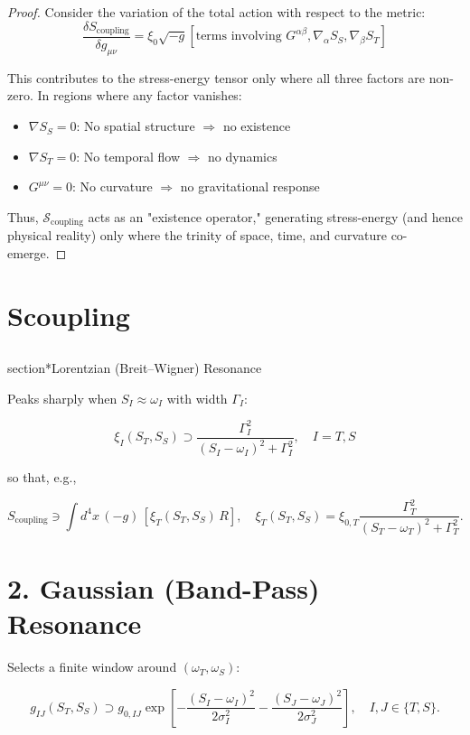 \documentclass[12pt, a4paper]{article}
\begin{document}
\begin{proof}
Consider the variation of the total action with respect to the metric:
\[
\frac{\delta S_{\text{coupling}}}{\delta g_{\mu\nu}} = 
\xi_0 \sqrt{-g} \left[ \text{terms involving } G^{\alpha\beta}, 
\nabla_\alpha S_S, \nabla_\beta S_T \right]
\]

This contributes to the stress-energy tensor only where all three factors are 
non-zero. In regions where any factor vanishes:
\begin{itemize}
    \item $\nabla S_S = 0$: No spatial structure $\Rightarrow$ no existence
    \item $\nabla S_T = 0$: No temporal flow $\Rightarrow$ no dynamics
    \item $G^{\mu\nu} = 0$: No curvature $\Rightarrow$ no gravitational response
\end{itemize}

Thus, $\mathcal{S}_{\text{coupling}}$ acts as an "existence operator," generating 
stress-energy (and hence physical reality) only where the trinity of space, time, 
and curvature co-emerge.
\end{proof}
\section{Scoupling}
\subsection{}section*{Lorentzian (Breit--Wigner) Resonance}

Peaks sharply when \( S_I \approx \omega_I \) with width \(\Gamma_I\):

\[
\xi_I (S_T,S_S) \supset \frac{\Gamma_I^2}{(S_I - \omega_I)^2 + \Gamma_I^2}, \quad I = T, S
\]

so that, e.g.,

\[
S_{\text{coupling}} \ni \int d^4 x \, (-g)\,[\xi_T(S_T,S_S)\, R], \quad \xi_T(S_T,S_S) = \xi_{0,T} \frac{\Gamma_T^2}{(S_T - \omega_T)^2 + \Gamma_T^2}.
\]

\section*{2. Gaussian (Band-Pass) Resonance}

Selects a finite window around \((\omega_T,\omega_S)\):

\[
g_{IJ}(S_T,S_S) \supset g_{0,IJ} \exp\left[
-\frac{(S_I - \omega_I)^2}{2 \sigma_I^2}
-\frac{(S_J - \omega_J)^2}{2 \sigma_J^2}
\right], \quad I,J \in \{T,S\}.
\]
\end{document}
